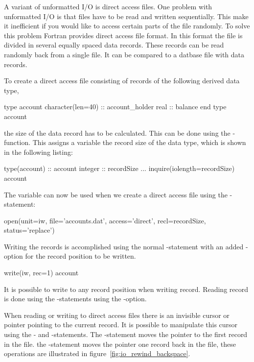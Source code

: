 A variant of unformatted I/O is direct access files. One problem with unformatted I/O is that files have to be read and written sequentially. This make it inefficient if you would like to access certain parts of the file randomly. To solve this problem Fortran provides direct access file format. In this format the file is divided in several equally spaced data records. These records can be read randomly back from a single file. It can be compared to a datbase file with data records. 

To create a direct access file consisting of records of the following derived data type,

\fmode

\begin{fortrancodeenv}
type account
    character(len=40) :: account_holder
	real :: balance
end type account
\end{fortrancodeenv}

the size of the data record has to be calculated. This can be done using the -function. This assigns a variable the record size of the data type, which is shown in the following listing:

\begin{fortrancodeenv}
type(account) :: account
integer :: recordSize
...	
inquire(iolength=recordSize) account
\end{fortrancodeenv}

The  variable can now be used when we create a direct access file using the -statement:

\begin{fortrancodeenv}
open(unit=iw, file='accounts.dat', access='direct', recl=recordSize, status='replace')
\end{fortrancodeenv}

Writing the records is accomplished using the normal -statement with an added -option for the record position to be written.

\begin{fortrancodeenv}
write(iw, rec=1) account
\end{fortrancodeenv}

It is possible to write to any record position when writing record. Reading record is done using the -statements using the -option.

When reading or writing to direct access files there is an invisible cursor or pointer pointing to the current record. It is possible to manipulate this cursor using the - and -statements. The -statement moves the pointer to the first record in the file. the -statement moves the pointer one record back in the file, these operations are illustrated in figure~\ref{fig:io_rewind_backspace}.

